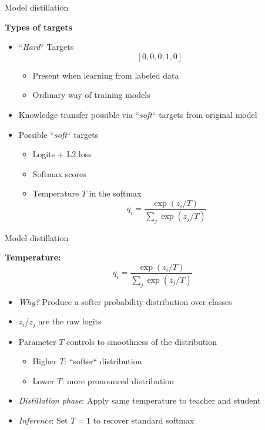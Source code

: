 \documentclass[11pt,compress,t,notes=noshow, xcolor=table]{beamer}
\begin{document}
\begin{frame}{Model distillation}

\vfill

\textbf{Types of targets} 

\begin{itemize}
	\item ``\textit{Hard}`` Targets $$[0, 0, 0, 1, 0]$$ \vspace{-.5cm}
		\begin{itemize}
			\item Present when learning from labeled data
			\item Ordinary way of training models
		\end{itemize}
	\item Knowledge transfer possible via ``\textit{soft}`` targets from original model
	\item Possible ``\textit{soft}`` targets
		\begin{itemize}
			\item Logits + L2 loss 
			\item Softmax scores
			\item Temperature $T$ in the softmax 
						$$q_i = \frac{\exp(z_i/T)}{\sum_j \exp(z_j/T)}$$
		\end{itemize}
\end{itemize}

\vfill

\end{frame}


\begin{frame}{Model distillation}

\vfill

\textbf{Temperature:}\\$$q_i = \frac{\exp(z_i/T)}{\sum_j \exp(z_j/T)}$$

\begin{itemize}
	\item \textit{Why?} Produce a softer probability distribution over classes
	\item $z_i$/$z_j$ are the raw logits
	\item Parameter $T$ controls to smoothness of the distribution
		\begin{itemize}
			\item Higher $T$: ``softer`` distribution
			\item Lower $T$: more pronounced distribution
		\end{itemize}
	\item \textit{Distillation phase}: Apply same temperature to teacher and student
	\item \textit{Inference}: Set $T = 1$ to recover standard softmax						
\end{itemize}

\vfill

\end{frame}
\end{document}
